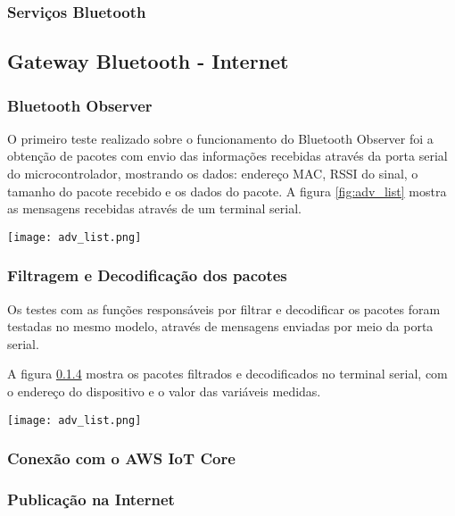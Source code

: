 \subsubsection{Serviços Bluetooth}

\subsection{Gateway Bluetooth - Internet}

\subsubsection{Bluetooth Observer}

O primeiro teste realizado sobre o funcionamento do Bluetooth Observer foi a
obtenção de pacotes com envio das informações recebidas através da porta serial
do microcontrolador, mostrando os dados: endereço MAC, RSSI do sinal, o tamanho
do pacote recebido e os dados do pacote. A figura \ref{fig:adv_list} mostra as
mensagens recebidas através de um terminal serial.

\begin{center}
	\centering 
	\texttt{[image: adv\_list.png]}
	\label{fig:adv_list}
\end{center} 

\subsubsection{Filtragem e Decodificação dos pacotes}
Os testes com as funções responsáveis por filtrar e decodificar os pacotes foram
testadas no mesmo modelo, através de mensagens enviadas por meio da porta
serial.

A figura \ref{} mostra os pacotes filtrados e decodificados no terminal serial,
com o endereço do dispositivo e o valor das variáveis medidas.

\begin{center}
	\centering 
	\texttt{[image: adv\_list.png]}
	\label{fig:adv_list}
\end{center} 


\subsubsection{Conexão com o AWS IoT Core}

\subsubsection{Publicação na Internet}

